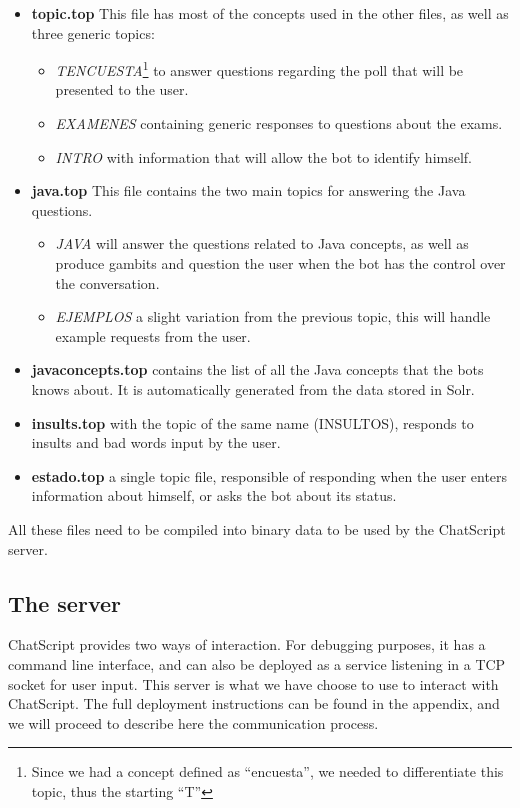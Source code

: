 \begin{itemize}
 \item \textbf{topic.top} This file has most of the concepts used in the other files, as well as three generic topics:
 \begin{itemize}
  \item \emph{TENCUESTA}\footnote{Since we had a concept defined as ``encuesta'', we needed to differentiate this topic, thus the starting ``T''} to answer questions regarding the poll that will be presented to the user.
  \item \emph{EXAMENES} containing generic responses to questions about the exams.
  \item \emph{INTRO} with information that will allow the bot to identify himself.
 \end{itemize}
 \item \textbf{java.top} This file contains the two main topics for answering the Java questions.
 \begin{itemize}
  \item \emph{JAVA} will answer the questions related to Java concepts, as well as produce gambits and question the user when the bot has the control over the conversation.
  \item \emph{EJEMPLOS} a slight variation from the previous topic, this will handle example requests from the user.
 \end{itemize}
 \item \textbf{javaconcepts.top} contains the list of all the Java concepts that the bots knows about. It is automatically generated from the data stored in Solr.
 \item \textbf{insults.top} with the topic of the same name (INSULTOS), responds to insults and bad words input by the user.
 \item \textbf{estado.top} a single topic file, responsible of responding when the user enters information about himself, or asks the bot about its status.
\end{itemize}

All these files need to be compiled into binary data to be used by the ChatScript server.

\subsection{The server}
\label{sec:csserver}

ChatScript provides two ways of interaction. For debugging purposes, it has a command line interface, and can also be deployed as a service listening in a TCP socket for user input. This server is what we have choose to use to interact with ChatScript. The full deployment instructions can be found in the appendix, and we will proceed to describe here the communication process.


